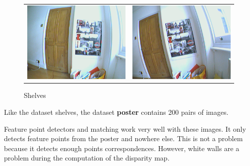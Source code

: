\documentclass[11pt]{report}
\begin{document}
\begin{figure}[H]
\begin{tabular}{cc}
\includegraphics[scale=0.25]{images/poster_left.png} &
\includegraphics[scale=0.25]{images/poster_right.png} \\
\end{tabular}
\caption{Shelves}
\end{figure}

Like the dataset shelves, the dataset \textbf{poster} contains 200 pairs of images.

Feature point detectors and matching work very well with these images. It only detects feature points from the poster and nowhere else. This is not a problem because it detects enough points correspondences. However, white walls are a problem during the computation of the disparity map.
\end{document}
